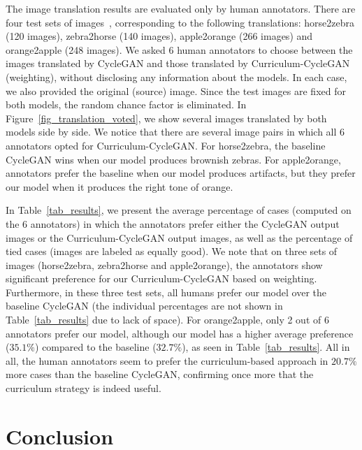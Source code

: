\documentclass[10pt,twocolumn,letterpaper]{article}
\begin{document}
The image translation results are evaluated only by human annotators. There are four test sets of images~\cite{Zhu-ICCV-2017}, corresponding to the following translations: horse2zebra (120 images), zebra2horse (140 images), apple2orange (266 images) and orange2apple (248 images). We asked 6 human annotators to choose between the images translated by CycleGAN and those translated by Curriculum-CycleGAN (weighting), without disclosing any information about the models. In each case, we also provided the original (source) image. Since the test images are fixed for both models, the random chance factor is eliminated. In Figure~\ref{fig_translation_voted}, we show several images translated by both models side by side. We notice that there are several image pairs in which all 6 annotators opted for Curriculum-CycleGAN. For horse2zebra, the baseline CycleGAN wins when our model produces brownish zebras. For apple2orange, annotators prefer the baseline when our model produces artifacts, but they prefer our model when it produces the right tone of orange. 

In Table~\ref{tab_results}, we present the average percentage of cases (computed on the 6 annotators) in which the annotators prefer either the CycleGAN output images or the Curriculum-CycleGAN output images, as well as the percentage of tied cases (images are labeled as equally good). We note that on three sets of images (horse2zebra, zebra2horse and apple2orange), the annotators show significant preference for our Curriculum-CycleGAN based on weighting. Furthermore, in these three test sets, all humans prefer our model over the baseline CycleGAN (the individual percentages are not shown in Table~\ref{tab_results} due to lack of space). For orange2apple, only 2 out of 6 annotators prefer our model, although our model has a higher average preference ($35.1\%$) compared to the baseline ($32.7\%$), as seen in Table~\ref{tab_results}. All in all, the human annotators seem to prefer the curriculum-based approach in $20.7\%$ more cases than the baseline CycleGAN, confirming once more that the curriculum strategy is indeed useful. 

\vspace{-0.2cm}
\section{Conclusion}
\label{sec_Conclusion}
\vspace{-0.1cm}
\end{document}
